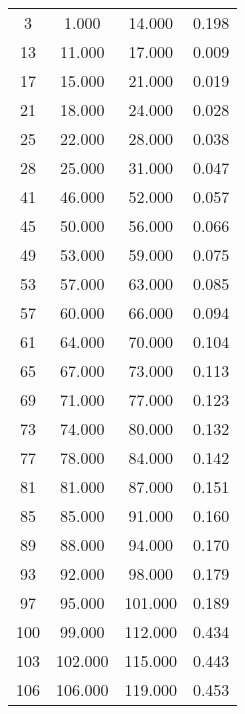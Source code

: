 % 
\begin{tabular}{cccc}
  \hline
  \hline
3 & 1.000 & 14.000 & 0.198 \\ 
  13 & 11.000 & 17.000 & 0.009 \\ 
  17 & 15.000 & 21.000 & 0.019 \\ 
  21 & 18.000 & 24.000 & 0.028 \\ 
  25 & 22.000 & 28.000 & 0.038 \\ 
  28 & 25.000 & 31.000 & 0.047 \\ 
  41 & 46.000 & 52.000 & 0.057 \\ 
  45 & 50.000 & 56.000 & 0.066 \\ 
  49 & 53.000 & 59.000 & 0.075 \\ 
  53 & 57.000 & 63.000 & 0.085 \\ 
  57 & 60.000 & 66.000 & 0.094 \\ 
  61 & 64.000 & 70.000 & 0.104 \\ 
  65 & 67.000 & 73.000 & 0.113 \\ 
  69 & 71.000 & 77.000 & 0.123 \\ 
  73 & 74.000 & 80.000 & 0.132 \\ 
  77 & 78.000 & 84.000 & 0.142 \\ 
  81 & 81.000 & 87.000 & 0.151 \\ 
  85 & 85.000 & 91.000 & 0.160 \\ 
  89 & 88.000 & 94.000 & 0.170 \\ 
  93 & 92.000 & 98.000 & 0.179 \\ 
  97 & 95.000 & 101.000 & 0.189 \\ 
  100 & 99.000 & 112.000 & 0.434 \\ 
  103 & 102.000 & 115.000 & 0.443 \\ 
  106 & 106.000 & 119.000 & 0.453 \\ 
   \hline
\end{tabular}
